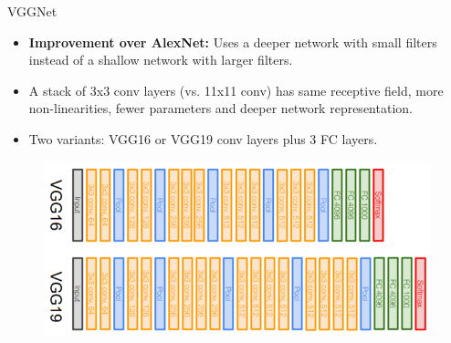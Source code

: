 \begin{frame}{VGGNet}
\begin{itemize}
    \item \textbf{Improvement over AlexNet:} Uses a deeper network with small filters instead of a shallow network with larger filters.
    \item A stack of 3x3 conv layers (vs. 11x11 conv) has same receptive field, more non-linearities, fewer parameters and deeper network representation.
    \item Two variants: VGG16 or VGG19 conv layers plus 3 FC layers.
\end{itemize}

\begin{figure}
\centering
\includegraphics[width=1.0\textwidth,height=0.5\textheight,keepaspectratio]{images/cnn/VGG_16_19.png}
\end{figure}
    
\end{frame}


